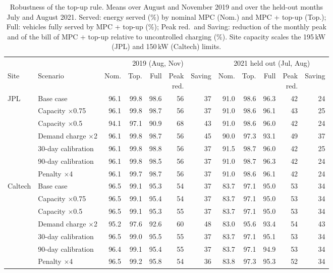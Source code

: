 \begin{table}[H]
\centering
\caption{Robustness of the top-up rule. Means over August and November 2019 and over the held-out months July and August 2021. Served: energy served (\%) by nominal MPC (Nom.) and MPC + top-up (Top.); Full: vehicles fully served by MPC + top-up (\%); Peak red.\ and Saving: reduction of the monthly peak and of the bill of MPC + top-up relative to uncontrolled charging (\%). Site capacity scales the 195\,kW (JPL) and 150\,kW (Caltech) limits.}
\label{tab:topuprob}
\footnotesize
\setlength{\tabcolsep}{1.5pt}
\begin{tabular*}{\textwidth}{@{\extracolsep{\fill}}llrrrrrrrrrr@{}}
\hline
 & & \multicolumn{5}{c}{2019 (Aug, Nov)} & \multicolumn{5}{c}{2021 held out (Jul, Aug)} \\
Site & Scenario & Nom. & Top. & Full & \makecell[r]{Peak\\red.} & Saving & Nom. & Top. & Full & \makecell[r]{Peak\\red.} & Saving \\
\hline
JPL & Base case & 96.1 & 99.8 & 98.6 & 56 & 37 & 91.0 & 98.6 & 96.3 & 42 & 24 \\
 & Capacity $\times$0.75 & 96.1 & 99.8 & 98.7 & 56 & 37 & 91.0 & 98.6 & 96.1 & 43 & 25 \\
 & Capacity $\times$0.5 & 94.1 & 97.1 & 90.9 & 68 & 43 & 91.0 & 98.6 & 96.0 & 42 & 24 \\
 & Demand charge $\times$2 & 96.1 & 99.8 & 98.7 & 56 & 45 & 90.0 & 97.3 & 93.1 & 49 & 37 \\
 & 30-day calibration & 96.1 & 99.8 & 98.8 & 56 & 37 & 91.5 & 98.7 & 96.0 & 42 & 25 \\
 & 90-day calibration & 96.1 & 99.8 & 98.5 & 56 & 37 & 91.0 & 98.7 & 96.3 & 42 & 24 \\
 & Penalty $\times$4 & 96.1 & 99.7 & 98.7 & 56 & 37 & 91.0 & 98.6 & 96.1 & 42 & 24 \\
\hline
Caltech & Base case & 96.5 & 99.1 & 95.3 & 54 & 37 & 83.7 & 97.1 & 95.0 & 53 & 34 \\
 & Capacity $\times$0.75 & 96.5 & 99.1 & 95.4 & 54 & 37 & 83.7 & 97.1 & 95.0 & 53 & 34 \\
 & Capacity $\times$0.5 & 96.5 & 99.1 & 95.3 & 55 & 37 & 83.7 & 97.1 & 95.0 & 53 & 34 \\
 & Demand charge $\times$2 & 95.2 & 97.6 & 92.6 & 60 & 48 & 83.0 & 95.6 & 93.4 & 54 & 43 \\
 & 30-day calibration & 96.5 & 99.0 & 95.5 & 55 & 37 & 83.7 & 97.1 & 95.1 & 53 & 34 \\
 & 90-day calibration & 96.4 & 99.1 & 95.4 & 55 & 37 & 83.7 & 97.1 & 94.9 & 53 & 34 \\
 & Penalty $\times$4 & 96.5 & 99.2 & 95.8 & 54 & 36 & 83.8 & 97.3 & 95.3 & 52 & 34 \\
\hline
\end{tabular*}
\end{table}
